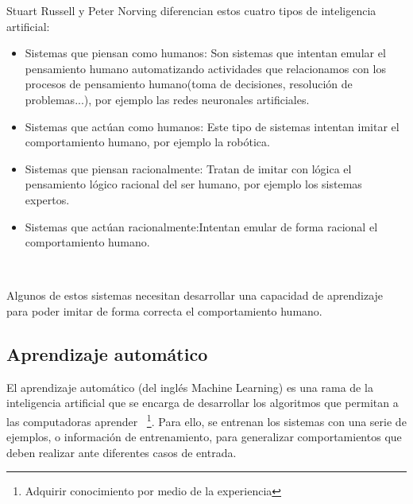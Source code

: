 Stuart Russell y Peter Norving diferencian estos cuatro tipos de inteligencia artificial:

\begin{itemize}
	\item{Sistemas que piensan como humanos}: Son sistemas que intentan emular el pensamiento humano automatizando actividades que relacionamos con los procesos de pensamiento humano(toma de decisiones, resolución de problemas...), por ejemplo las redes neuronales artificiales.
	\item{Sistemas que actúan como humanos}: Este tipo de sistemas intentan imitar el comportamiento humano, por ejemplo la robótica.
	\item{Sistemas que piensan racionalmente}: Tratan de imitar con lógica el pensamiento lógico racional del ser humano, por ejemplo los sistemas expertos.
	\item{Sistemas que actúan racionalmente}:Intentan emular de forma racional el comportamiento humano.
\end{itemize}~\cite{wiki:tiposInteligenciaArtificial}

Algunos de estos sistemas necesitan desarrollar una capacidad de aprendizaje para poder imitar de forma correcta el comportamiento humano.

\subsection{Aprendizaje automático}

El aprendizaje automático (del inglés Machine Learning) es una rama de la inteligencia artificial que se encarga de desarrollar los algoritmos que permitan a las computadoras aprender ~\footnote{Adquirir conocimiento por medio de la experiencia}. Para ello, se entrenan los sistemas con una serie de ejemplos, o información de entrenamiento, para generalizar comportamientos que deben realizar ante diferentes casos de entrada.


